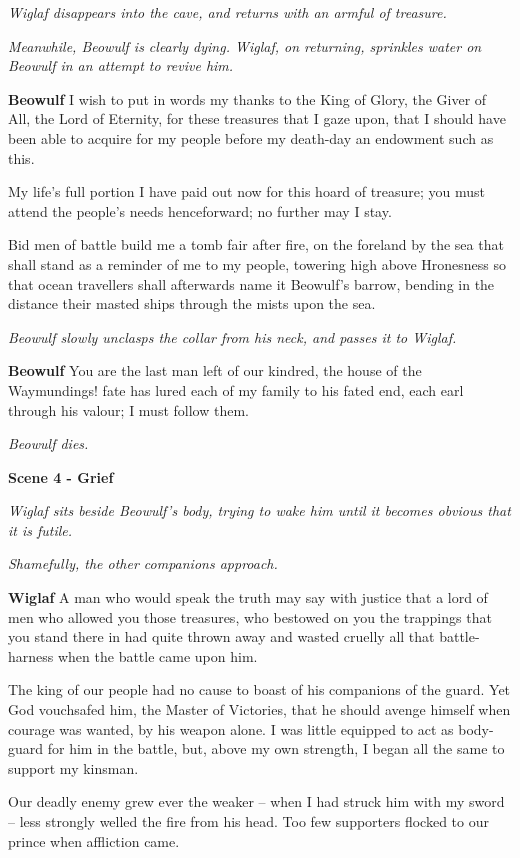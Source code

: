 \documentclass[a4paper]{article}
\begin{document}
{\centerline{\textit{Wiglaf disappears into the cave, and returns with an armful of treasure.}}
\centerline{\textit{Meanwhile, Beowulf is clearly dying. Wiglaf, on returning, 
sprinkles water on Beowulf in an attempt to revive him.}}

\textbf{Beowulf} I wish to put in words my thanks
to the King of Glory, the Giver of All,
the Lord of Eternity, for these treasures that I gaze upon,
that I should have been able to acquire for my people
before my death-day an endowment such as this.

My life’s full portion I have paid out now
for this hoard of treasure; you must attend the people’s
needs henceforward; no further may I stay.

Bid men of battle build me a tomb
fair after fire, on the foreland by the sea
that shall stand as a reminder of me to my people,
towering high above Hronesness
so that ocean travellers shall afterwards name it
Beowulf’s barrow, bending in the distance
their masted ships through the mists upon the sea.

\centerline{\textit{Beowulf slowly unclasps the collar from his neck, and passes it to Wiglaf.}}

\textbf{Beowulf} You are the last man left of our kindred,
the house of the Waymundings! fate has lured
each of my family to his fated end,
each earl through his valour; I must follow them.

\centerline{\textit{Beowulf dies.}}

\centerline{\textbf{Scene 4 - Grief}}
\centerline{\textit{Wiglaf sits beside Beowulf's body, trying to wake him until it becomes obvious that it is futile.}}
\centerline{\textit{Shamefully, the other companions approach.}}

\textbf{Wiglaf} A man who would speak the truth may say with justice
that a lord of men who allowed you those treasures,
who bestowed on you the trappings that you stand there in
had quite thrown away and wasted cruelly
all that battle-harness when the battle came upon him.

The king of our people had no cause to boast
of his companions of the guard. Yet God vouchsafed him,
the Master of Victories, that he should avenge himself
when courage was wanted, by his weapon alone.
I was little equipped to act as body-guard
for him in the battle, but, above my own strength,
I began all the same to support my kinsman.

Our deadly enemy grew ever the weaker –
when I had struck him with my sword – less strongly welled
the fire from his head. Too few supporters
flocked to our prince when affliction came.

}
\end{document}
